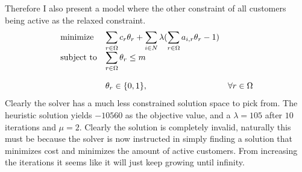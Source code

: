 \documentclass{article}
\begin{document}
    Therefore I also present a model where the other constraint of all customers being active as the relaxed constraint.
    \begin{equation*}
        \begin{array}{ll@{}ll}
            \text{minimize}  & \displaystyle\sum_{r \in \Omega} c_r \theta_r + \sum_{i \in N} \lambda(\sum_{r \in \Omega} a_{i, r} \theta_r - 1)& &\\
            \text{subject to}&  \displaystyle\sum_{r \in \Omega} \theta_r \leq m &   &\\\\
            & \displaystyle \theta_r  \in \{0,1\},  && \forall r \in \Omega
        \end{array}
    \end{equation*}
    Clearly the solver has a much less constrained solution space to pick from.
    The heuristic solution yields $-10560$ as the objective value, and a $\lambda=105$ after $10$ iterations and $\mu = 2$.
    Clearly the solution is completely invalid, naturally this must be because the solver is now instructed in simply finding a solution that minimizes cost and minimizes the amount of active customers.
    From increasing the iterations it seems like it will just keep growing until infinity.
\end{document}
